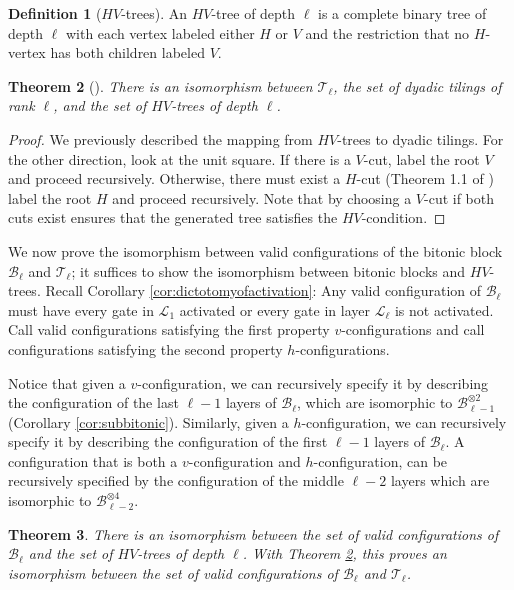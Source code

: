 \documentclass[11pt,letterpaper]{article}
\newtheorem{theorem}{Theorem}[section]
\theoremstyle{definition}
\newtheorem{definition}[theorem]{Definition}
\theoremstyle{remark}
\newcommand{\cB}{\mathcal B}
\newcommand{\cL}{\mathcal L}
\newcommand{\cT}{\mathcal T}
\numberwithin{equation}{section}
\theoremstyle{definition}
\begin{document}
\begin{definition}[$HV$-trees]
An $HV$-tree of depth $\ell$ is a complete binary tree of depth $\ell$ with each vertex labeled either $H$ or $V$ and the restriction that no $H$-vertex has both children labeled $V$.
\end{definition}

\begin{theorem}[\cite{randomdyadictilingsoftheunitsquare}]
There is an isomorphism between $\cT_{\ell}$, the set of dyadic tilings of rank $\ell$, and the set of $HV$-trees of depth $\ell$.
\label{thm:dyadichv}
\end{theorem}

\begin{proof}
We previously described the mapping from $HV$-trees to dyadic tilings. For the other direction, look at the unit square. If there is a $V$-cut, label the root $V$ and proceed recursively. Otherwise, there must exist a $H$-cut (Theorem 1.1 of \cite{randomdyadictilingsoftheunitsquare}) label the root $H$ and proceed recursively. Note that by choosing a $V$-cut if both cuts exist ensures that the generated tree satisfies the $HV$-condition.
\end{proof}

We now prove the isomorphism between valid configurations of the bitonic block $\cB_{\ell}$ and $\cT_{\ell}$; it suffices to show the isomorphism between bitonic blocks and $HV$-trees. Recall Corollary \ref{cor:dictotomyofactivation}: Any valid configuration of $\cB_{\ell}$ must have every gate in $\cL_1$ activated or every gate in layer $\cL_{\ell}$ is not activated. Call valid configurations satisfying the first property $v$-configurations and call configurations satisfying the second property $h$-configurations.

Notice that given a $v$-configuration, we can recursively specify it by describing the configuration of the last $\ell - 1$ layers of $\cB_{\ell}$, which are isomorphic to $\cB_{\ell - 1}^{\otimes 2}$ (Corollary \ref{cor:subbitonic}). Similarly, given a $h$-configuration, we can recursively specify it by describing the configuration of the first $\ell - 1$ layers of $\cB_\ell$. A configuration that is both a $v$-configuration and $h$-configuration, can be recursively specified by the configuration of the middle $\ell - 2$ layers which are isomorphic to $\cB_{\ell - 2}^{\otimes 4}$.

\begin{theorem}
There is an isomorphism between the set of valid configurations of $\cB_{\ell}$ and the set of $HV$-trees of depth $\ell$. With Theorem \ref{thm:dyadichv}, this proves an isomorphism between the set of valid configurations of $\cB_{\ell}$ and $\cT_{\ell}$.
\label{thm:isomorphism}
\end{theorem}
\end{document}

